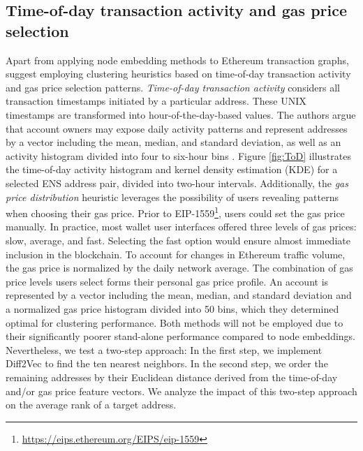 \documentclass[12pt,a4paper,titlepage,oneside,english]{article}
\begin{document}
\iffalse
The intuition of Diff2Vec is to summarize a node by its neighborhood through a diffusion-like random process. Specifically, there are four steps to Diff2Vec: 1) Generating a diffusion graph, 2) sampling a node sequence, 3) extracting features, 4) learning a neural network embedding
\fi

\subsection{Time-of-day transaction activity and gas price selection}
Apart from applying node embedding methods to Ethereum transaction graphs, \cite{Beres2020} suggest employing clustering heuristics based on time-of-day transaction activity and gas price selection patterns. \newline
\textit{Time-of-day transaction activity} considers all transaction timestamps initiated by a particular address. These UNIX timestamps are transformed into hour-of-the-day-based values. The authors argue that account owners may expose daily activity patterns and represent addresses by a vector including the mean, median, and standard deviation, as well as an activity histogram divided into four to six-hour bins \citep{Beres2020}.  Figure \ref{fig:ToD} illustrates the time-of-day activity histogram and kernel density estimation (KDE) for a selected ENS address pair, divided into two-hour intervals.\newline
Additionally, the \textit{gas price distribution} heuristic leverages the possibility of users revealing patterns when choosing their gas price. Prior to EIP-1559\footnote{\url{https://eips.ethereum.org/EIPS/eip-1559}}, users could set the gas price manually. In practice, most wallet user interfaces offered three levels of gas prices: slow, average, and fast. Selecting the fast option would ensure almost immediate inclusion in the blockchain. To account for changes in Ethereum traffic volume, the gas price is normalized by the daily network average. The combination of gas price levels users select forms their personal gas price profile. An account is represented by a vector including the mean, median, and standard deviation and a normalized gas price histogram divided into 50 bins, which they determined optimal for clustering performance. \citep{Beres2020} \newline
Both methods will not be employed due to their significantly poorer stand-alone performance compared to node embeddings. Nevertheless, we test a two-step approach: In the first step, we implement Diff2Vec to find the ten nearest neighbors. In the second step, we order the remaining addresses by their Euclidean distance derived from the time-of-day and/or gas price feature vectors. We analyze the impact of this two-step approach on the average rank of a target address.
\end{document}
